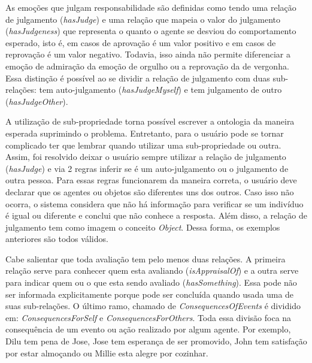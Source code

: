 As emoções que julgam responsabilidade são definidas como tendo uma relação de
julgamento (\emph{hasJudge}) e uma relação que mapeia o valor do julgamento
(\emph{hasJudgeness}) que representa o quanto o agente se desviou do
comportamento esperado, isto é, em casos de aprovação é um valor positivo e em
casos de reprovação é um valor negativo. Todavia, isso ainda não permite
diferenciar a emoção de admiração da emoção de orgulho ou a reprovação da de
vergonha. Essa distinção é possível ao se dividir a relação de julgamento com
duas sub-relações: tem auto-julgamento (\emph{hasJudgeMyself}) e tem
julgamento de outro (\emph{hasJudgeOther}).

A utilização de sub-propriedade torna possível escrever a ontologia da maneira
esperada suprimindo o problema. Entretanto, para o usuário pode se tornar
complicado ter que lembrar quando utilizar uma sub-propriedade ou outra.
Assim, foi resolvido deixar o usuário sempre utilizar a relação de julgamento
(\emph{hasJudge}) e via 2 regras inferir se é um auto-julgamento ou o
julgamento de outra pessoa. Para essas regras funcionarem da maneira correta,
o usuário deve declarar que os agentes ou objetos são diferentes uns dos
outros. Caso isso
não ocorra, o sistema considera que não há informação para verificar se um
indivíduo é igual ou diferente e conclui que não conhece a resposta. Além
disso, a relação de julgamento tem como imagem o conceito \emph{Object}. Dessa
forma, os exemplos anteriores são todos válidos.

Cabe salientar que toda avaliação tem pelo menos duas relações. A primeira
relação serve para conhecer quem esta avaliando (\emph{isAppraisalOf}) e a
outra serve para indicar quem ou o que esta sendo avaliado
(\emph{hasSomething}). Essa pode não ser informada explicitamente porque pode
ser concluída quando usada uma de suas sub-relações. O último ramo, chamado de
\emph{ConsequencesOfEvents} é dividido em: \emph{ConsequencesForSelf} e
\emph{ConsequencesForOthers}. Toda essa divisão foca na consequência de um
evento ou ação realizado por algum agente. Por exemplo, Dilu tem pena
de Jose, Jose tem esperança de ser promovido, John tem satisfação por
estar almoçando ou Millie esta alegre por cozinhar.

